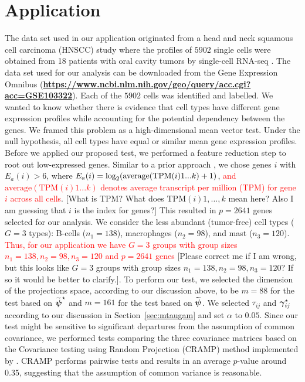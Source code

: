 \documentclass[times,sort&compress,3p]{elsarticle}
\theoremstyle{plain}%
\theoremstyle{definition}
\def\log{\hbox{log}}
\def\log{\hbox{log}}
\def\boldpsi{{\mbox{\boldmath $\psi$}}}
\newcommand{\ugamma}            {\mbox{\boldmath$\gamma$}}
\begin{document}
\section{Application} \label{sec:Application}

The data set used in our application originated from a head and neck squamous cell carcinoma (HNSCC) study where the profiles of $5902$ single cells were obtained from 18 patients with oral cavity tumors by single-cell RNA-seq \cite{puram2017single}. The data set used for our analysis can be downloaded from the Gene Expression Omnibus (\textbf{\url{https://www.ncbi.nlm.nih.gov/geo/query/acc.cgi?acc=GSE103322}}). Each of the $5902$ cells was identified and labelled. %
We wanted to know whether there is evidence that cell types have different gene expression profiles while accounting for the potential dependency between the genes. We framed this problem as a high-dimensional mean vector test. Under the null hypothesis, all cell types have equal or similar mean gene expression profiles. Before we applied our proposed test, we performed a feature reduction step to root out low-expressed genes. Similar to a prior approach \cite{puram2017single}, we chose genes $i$ with $E_a(i) > 6$, where $E_a(i)=\log_2(\text{average}(\text{TPM}(i)1...k)+1)$, \textcolor{red}{ and $\text{average}(\text{TPM}(i)1...k)$ denotes average transcript per million (TPM) for gene $i$ across all cells}. {\color{blue}[What is TPM? What does $\text{TPM}(i)1,\ldots,k$ mean here? Also I am guessing that $i$ is the index for genes?]} This resulted in $p = 2641$ genes selected for our analysis. We consider the less abundant (tumor-free) cell types ($G=3$ types): B-cells ($n_1=138$), macrophages ($n_2 = 98$), and mast ($n_3 = 120$). \textcolor{red}{Thus, for our application we have $G = 3$ groups with group sizes $n_1 = 138,n_2 = 98,n_3 = 120$ and $p=2641$ genes} {\color{blue}[Please correct me if I am wrong, but this looks like $G = 3$ groups with group sizes $n_1 = 138,n_2 = 98,n_3 = 120$? If so it would be better to clarify.]}. To perform our test, we selected the dimension of the projections space, according to our discussion above, to be $m = 88$ for the test based on $\widetilde{\boldpsi}^{\star}$ and $m = 161$ for the test based on $\widetilde{\boldpsi}$. We selected $\tau_{ij}$ and $\ugamma^{\star}_{ij}$ according to our discussion in Section~\ref{sec:mtaugam} and set $\alpha$ to $0.05$. Since our test might be sensitive to significant departures from the assumption of common covariance, we performed tests comparing the three covariance matrices based on the Covariance testing using Random Projection (CRAMP) method implemented by \cite{ayyala2022covariance}. CRAMP performs pairwise tests and results in an average $p$-value around 0.35, suggesting that the assumption of common variance is reasonable. 
 
\end{document}
